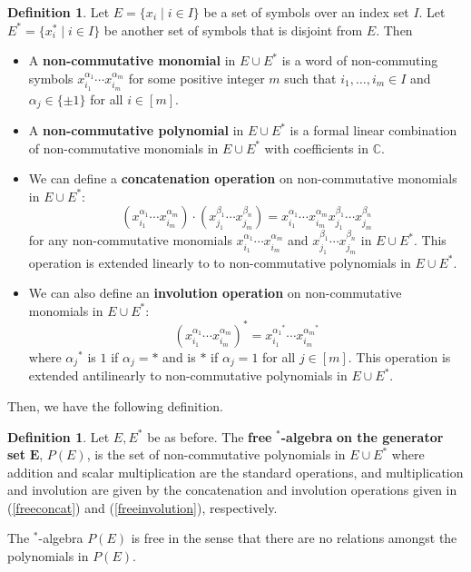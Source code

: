 \documentclass{article}
\theoremstyle{plain}
\theoremstyle{definition}
\newtheorem{definition}[theorem]{Definition}
\theoremstyle{remark}
\begin{document}
\begin{definition}
	Let $E = \{x_i \mid i \in I\}$ be a set of symbols over an index set $I$.
	Let $E^* = \{x_i^* \mid i \in I\}$ be another set of symbols 
	that is disjoint from $E$. Then
	\begin{itemize}
		\item	A \textbf{non-commutative monomial} in $E \cup E^*$ is a word
			of non-commuting symbols
			$x_{i_1}^{\alpha_1}\cdots{x_{i_m}^{\alpha_m}}$
			for some positive integer $m$
			such that $i_1, \dots, i_m \in I$
			and $\alpha_j \in \{\pm 1\}$ for all $i \in [m]$.
		\item	A \textbf{non-commutative polynomial} in $E \cup E^*$ is
			a formal linear combination of non-commutative monomials
			in $E \cup E^*$ with coefficients in $\mathbb{C}$.
		\item	We can define a \textbf{concatenation operation} on 
			non-commutative monomials in $E \cup E^*$:
			\begin{equation} \label{freeconcat}
				(x_{i_1}^{\alpha_1}\cdots{x_{i_m}^{\alpha_m}})	
				\cdot
				(x_{j_1}^{\beta_1}\cdots{x_{j_m}^{\beta_n}})	
				=
				x_{i_1}^{\alpha_1}\cdots{x_{i_m}^{\alpha_m}}
				x_{j_1}^{\beta_1}\cdots{x_{j_m}^{\beta_n}}
			\end{equation}
			for any non-commutative monomials
			$x_{i_1}^{\alpha_1}\cdots{x_{i_m}^{\alpha_m}}$
			and
			$x_{j_1}^{\beta_1}\cdots{x_{j_m}^{\beta_n}}$
			in $E \cup E^*$.
			This operation is extended linearly to 
			to non-commutative polynomials in $E \cup E^*$.
		\item	We can also define an \textbf{involution operation} on 
			non-commutative monomials in $E \cup E^*$:
			\begin{equation} \label{freeinvolution}
				(x_{i_1}^{\alpha_1}\cdots{x_{i_m}^{\alpha_m}})^*
				=
				x_{i_1}^{{\alpha_1}^*}\cdots{x_{i_m}^{{\alpha_m}^*}}
			\end{equation}
			where ${{\alpha_j}^*}$ is $1$ if $\alpha_j = *$ and is $*$
			if $\alpha_j = 1$ for all $j \in [m]$.
			This operation is extended antilinearly 
			to non-commutative polynomials in $E \cup E^*$.
	\end{itemize}
\end{definition}

Then, we have the following definition.

\begin{definition}
	Let $E, E^*$ be as before.
	The \textbf{free} $\bm{^*}$\textbf{-algebra} 
	\textbf{on the generator set} $\bm{E}$, $P(E)$,
	is the set of non-commutative polynomials in $E \cup E^*$
	where addition and scalar multiplication are the standard operations,
	and
	multiplication and involution are given by the concatenation and involution
	operations given in (\ref{freeconcat}) and (\ref{freeinvolution}), respectively.

	The $^*$-algebra $P(E)$ is free in the sense that there are no relations
	amongst the polynomials in $P(E)$.
\end{definition}
\end{document}
